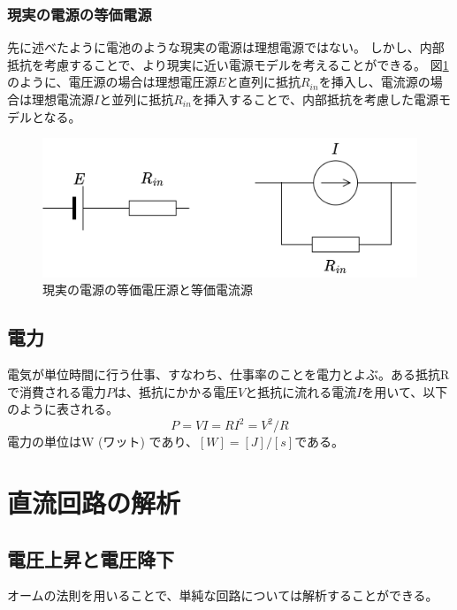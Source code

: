 \documentclass{ltjsreport}
\begin{document}
\subsubsection{現実の電源の等価電源} \label{sec:source}
先に述べたように電池のような現実の電源は理想電源ではない。
しかし、内部抵抗を考慮することで、より現実に近い電源モデルを考えることができる。
図\ref{fig:real_battery}のように、電圧源の場合は理想電圧源$E$と直列に抵抗$R_{in}$を挿入し、電流源の場合は理想電流源$I$と並列に抵抗$R_{in}$を挿入することで、内部抵抗を考慮した電源モデルとなる。
\begin{figure}[tb]
  \centering
  \includegraphics[keepaspectratio, scale=0.07]
       {img/real_battery.drawio.png}
  \caption{現実の電源の等価電圧源と等価電流源}
  \label{fig:real_battery}
 \end{figure}




\subsection{電力}

電気が単位時間に行う仕事、すなわち、仕事率のことを電力とよぶ。ある抵抗Rで消費される電力$P$は、抵抗にかかる電圧$V$と抵抗に流れる電流$I$を用いて、以下のように表される。
\[
  P = VI = RI^2 = V^2/R
\]
電力の単位はW (ワット) であり、$[\si{W}] = [\si{J}]/[\si{s}]$である。



\section{直流回路の解析}

\subsection{電圧上昇と電圧降下}
オームの法則を用いることで、単純な回路については解析することができる。
\end{document}
